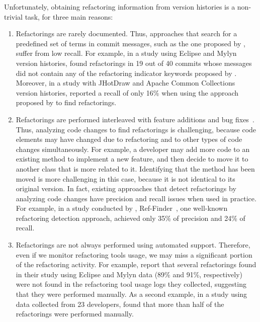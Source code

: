 Unfortunately, obtaining refactoring information from version histories is a non-trivial task, for three main reasons:
\begin{enumerate}
\item Refactorings are rarely documented.
Thus, approaches that search for a predefined set of terms in commit messages, such as the one proposed by \cite{ratzinger2008relation}, suffer from low recall.
For example, in a study using Eclipse and Mylyn version histories,
\cite{MurphyHill2012} found refactorings in 19 out of 40 commits whose messages did not contain any of the refactoring indicator keywords proposed by \cite{ratzinger2008relation}.
Moreover, in a study with JHotDraw and Apache Common Collections version histories, \cite{Soares:2013} reported a recall of only 16\% when using the approach proposed by \cite{ratzinger2008relation} to find refactorings.

\item Refactorings are performed interleaved with feature additions and bug fixes~\citep{MurphyHill2012}.
Thus, analyzing code changes to find refactorings is challenging, because code elements may have changed due to refactoring and to other types of code changes simultaneously.
For example, a developer may add more code to an existing method to implement a new feature, and then decide to move it to another class that is more related to it.
Identifying that the method has been moved is more challenging in this case, because it is not identical to its original version.
In fact, existing approaches that detect refactorings by analyzing code changes have precision and recall issues when used in practice.
For example, in a study conducted by \cite{Soares:2013}, Ref-Finder~\citep{Prete:2010,Kim:2010:RefFinder}, one well-known refactoring detection approach, achieved only 35\% of precision and 24\% of recall.

\item Refactorings are not always performed using automated support.
Therefore, even if we monitor refactoring tools usage, we may miss a significant portion of the refactoring activity.
For example, \cite{MurphyHill2012} report that several refactorings found in their study using Eclipse and Mylyn data (89\% and 91\%, respectively) were not found in the refactoring tool usage logs they collected, suggesting that they were performed manually.
As a second example, in a study using data collected from 23 developers, \cite{negara2013} found that more than half of the refactorings were performed manually.
\end{enumerate}

